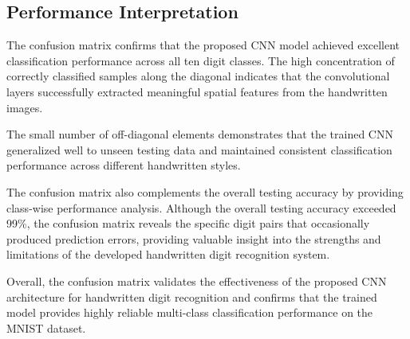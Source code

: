\subsection{Performance Interpretation}

The confusion matrix confirms that the proposed CNN model achieved excellent classification performance across all ten digit classes. The high concentration of correctly classified samples along the diagonal indicates that the convolutional layers successfully extracted meaningful spatial features from the handwritten images.

The small number of off-diagonal elements demonstrates that the trained CNN generalized well to unseen testing data and maintained consistent classification performance across different handwritten styles.

The confusion matrix also complements the overall testing accuracy by providing class-wise performance analysis. Although the overall testing accuracy exceeded 99\%, the confusion matrix reveals the specific digit pairs that occasionally produced prediction errors, providing valuable insight into the strengths and limitations of the developed handwritten digit recognition system.

Overall, the confusion matrix validates the effectiveness of the proposed CNN architecture for handwritten digit recognition and confirms that the trained model provides highly reliable multi-class classification performance on the MNIST dataset.